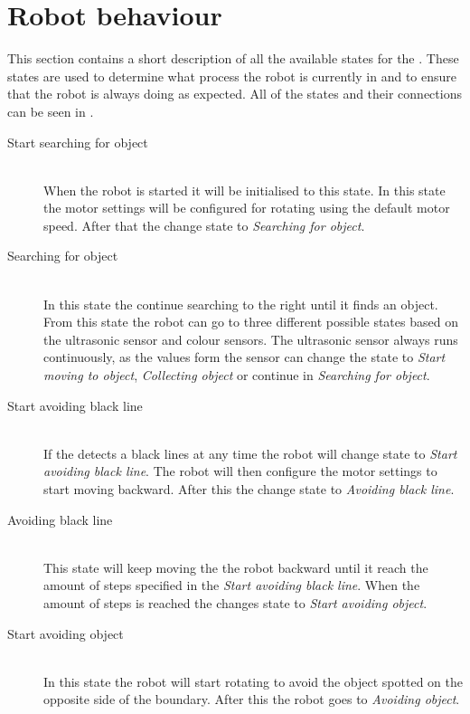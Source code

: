 \section{Robot behaviour} \label{sec:robot_behaviour}
This section contains a short description of all the available states for the \projname{}. These states are used to determine what process the robot is currently in and to ensure that the robot is always doing as expected. All of the states and their connections can be seen in .

\begin{description}
\item[Start searching for object] \hfill \\
When the robot is started it will be initialised to this state. In this state the motor settings will be configured for rotating using the default motor speed. After that the \projname{} change state to \emph{Searching for object}.

\item[Searching for object] \hfill \\
In this state the \projname{} continue searching to the right until it finds an object. From this state the robot can go to three different possible states based on the ultrasonic sensor and colour sensors. The ultrasonic sensor always runs continuously, as the values form the sensor can change the state to \emph{Start moving to object}, \emph{Collecting object} or continue in \emph{Searching for object}. 

\item[Start avoiding black line] \hfill \\
If the \projname{} detects a black lines at any time the robot will change state to \emph{Start avoiding black line}. The robot will then configure the motor settings to start moving backward. After this the \projname{} change state to \emph{Avoiding black line}. 

\item[Avoiding black line] \hfill \\
This state will keep moving the the robot backward until it reach the amount of steps specified in the \emph{Start avoiding black line}. When the amount of steps is reached the \projname{} changes state to \emph{Start avoiding object}.

\item[Start avoiding object] \hfill \\
In this state the robot will start rotating to avoid the object spotted on the opposite side of the boundary. After this the robot goes to \emph{Avoiding object}. 


\end{description}
